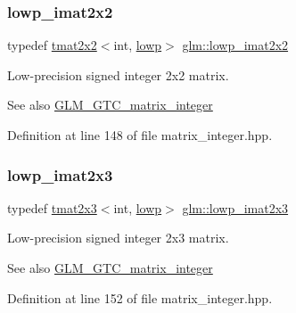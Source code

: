 \subsubsection{\texorpdfstring{lowp\_imat2x2}{lowp\_imat2x2}}
{\footnotesize\ttfamily typedef \mbox{\hyperlink{structglm_1_1tmat2x2}{tmat2x2}}$<$int, \mbox{\hyperlink{namespaceglm_a0f04f086094c747d227af4425893f545ae161af3fc695e696ce3bf69f7332bc2d}{lowp}}$>$ \mbox{\hyperlink{group__gtc__matrix__integer_gad1950bd75bc033e8511cec3deb15af56}{glm\+::lowp\+\_\+imat2x2}}}

Low-\/precision signed integer 2x2 matrix. \begin{DoxySeeAlso}{See also}
\mbox{\hyperlink{group__gtc__matrix__integer}{G\+L\+M\+\_\+\+G\+T\+C\+\_\+matrix\+\_\+integer}} 
\end{DoxySeeAlso}


Definition at line 148 of file matrix\+\_\+integer.\+hpp.

\mbox{\label{group__gtc__matrix__integer_ga00e00501dd9bf929e1dca7a167ba526b}} 
\subsubsection{\texorpdfstring{lowp\_imat2x3}{lowp\_imat2x3}}
{\footnotesize\ttfamily typedef \mbox{\hyperlink{structglm_1_1tmat2x3}{tmat2x3}}$<$int, \mbox{\hyperlink{namespaceglm_a0f04f086094c747d227af4425893f545ae161af3fc695e696ce3bf69f7332bc2d}{lowp}}$>$ \mbox{\hyperlink{group__gtc__matrix__integer_ga00e00501dd9bf929e1dca7a167ba526b}{glm\+::lowp\+\_\+imat2x3}}}

Low-\/precision signed integer 2x3 matrix. \begin{DoxySeeAlso}{See also}
\mbox{\hyperlink{group__gtc__matrix__integer}{G\+L\+M\+\_\+\+G\+T\+C\+\_\+matrix\+\_\+integer}} 
\end{DoxySeeAlso}


Definition at line 152 of file matrix\+\_\+integer.\+hpp.

\mbox{\label{group__gtc__matrix__integer_gaf664d339f1b66e62ed07c913e60be940}} 
